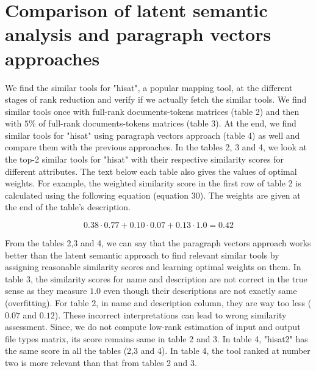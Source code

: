 \section{Comparison of latent semantic analysis and paragraph vectors approaches}
We find the similar tools for "hisat", a popular mapping tool, at the different stages of rank reduction and verify if we actually fetch the similar tools. We find similar tools once with full-rank documents-tokens matrices (table 2) and then with $5\%$ of full-rank documents-tokens matrices (table 3). At the end, we find similar tools for "hisat" using paragraph vectors approach (table 4) as well and compare them with the previous approaches. In the tables 2, 3 and 4, we look at the top-2 similar tools for "hisat" with their respective similarity scores for different attributes. The text below each table also gives the values of optimal weights. For example, the weighted similarity score in the first row of table 2 is calculated using the following equation (equation 30). The weights are given at the end of the table's description.

\begin{equation}
0.38 \cdot 0.77 + 0.10 \cdot 0.07 + 0.13 \cdot 1.0 = 0.42
\end{equation}

From the tables 2,3 and 4, we can say that the paragraph vectors approach works better than the latent semantic approach to find relevant similar tools by assigning reasonable similarity scores and learning optimal weights on them. In table 3, the similarity scores for name and description are not correct in the true sense as they measure $1.0$ even though their descriptions are not exactly same (overfitting). For table 2, in name and description column, they are way too less ($0.07$ and $0.12$). These incorrect interpretations can lead to wrong similarity assessment. Since, we do not compute low-rank estimation of input and output file types matrix, its score remains same in table 2 and 3. In table 4, "hisat2" has the same score in all the tables (2,3 and 4). In table 4, the tool ranked at number two is more relevant than that from tables 2 and 3.

